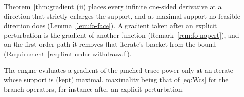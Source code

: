
Theorem~\ref{thm:gradient}\,(ii) places every infinite one-sided
derivative at a direction that strictly enlarges the support, and at
maximal support no feasible direction does (Lemma~\ref{lem:fo-face}). A
gradient taken after an explicit perturbation is the gradient of another
function (Remark~\ref{rem:fo-nopert}), and on the first-order path it
removes that iterate's bracket from the bound
(Requirement~\ref{req:first-order-withdrawal}).

\begin{requirement}\label{req:gradient-at-maximal-support}
The engine evaluates a gradient of the pinched trace power only at an
iterate whose support is (kept) maximal, maximality being that of
\eqref{eq:Wcs} for the branch operators, for instance after an explicit
perturbation.
\end{requirement}

